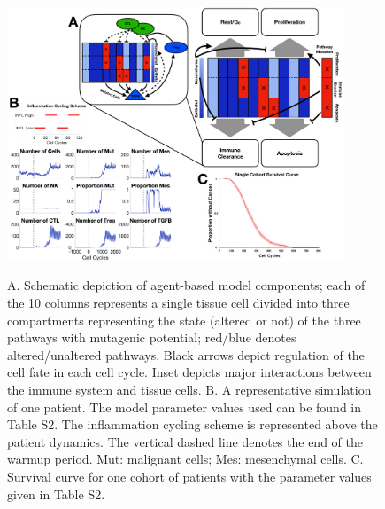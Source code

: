 \documentclass[11pt]{article}
\newcommand{\tcr} { \textcolor{red} }
\begin{document}
\begin{figure}
\center
{\includegraphics[width=0.9\textwidth]{Figure1/Figure1.pdf}}
\caption{A. Schematic depiction of agent-based model components; each of the 10 columns represents a single tissue cell divided into three compartments representing the state (altered or not) of the three pathways with mutagenic potential; red/blue denotes altered/unaltered pathways. Black arrows depict regulation of the cell fate in each cell cycle. Inset depicts major interactions between the immune system and tissue cells.
B. A representative simulation of one patient. The model parameter values used can be found in Table S2. 
The inflammation cycling scheme is represented above the patient dynamics. The vertical dashed line denotes the end of the warmup period. Mut: malignant cells; Mes: mesenchymal cells. 
C. Survival curve for one cohort of patients with the parameter values given in Table S2.}
\label{fig:ModelIntro}
\end{figure}
\end{document}
